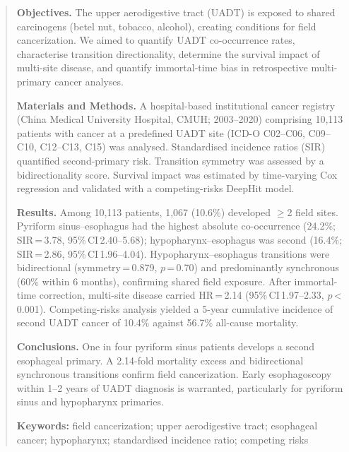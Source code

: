 \documentclass[12pt,a4paper]{article}
\begin{document}
\newpage
\begin{abstract}
\noindent\textbf{Objectives.}
The upper aerodigestive tract (UADT) is exposed to shared carcinogens (betel nut,
tobacco, alcohol), creating conditions for field cancerization.
We aimed to quantify UADT co-occurrence rates, characterise transition
directionality, determine the survival impact of multi-site disease, and
quantify immortal-time bias in retrospective multi-primary cancer analyses.

\noindent\textbf{Materials and Methods.}
A hospital-based institutional cancer registry (China Medical University Hospital,
CMUH; 2003--2020) comprising 10,113 patients with cancer at a predefined UADT site (ICD-O C02--C06, C09--C10, C12--C13, C15)
was analysed. Standardised incidence ratios (SIR) quantified second-primary risk.
Transition symmetry was assessed by a bidirectionality score.
Survival impact was estimated by time-varying Cox regression and validated with
a competing-risks DeepHit model.

\noindent\textbf{Results.}
Among 10,113 patients, 1,067 (10.6\%) developed $\geq$2 field sites.
Pyriform sinus--esophagus had the highest absolute co-occurrence (24.2\%;
SIR\,=\,3.78, 95\%\,CI\,2.40--5.68); hypopharynx--esophagus was second
(16.4\%; SIR\,=\,2.86, 95\%\,CI\,1.96--4.04). Hypopharynx--esophagus transitions
were bidirectional (symmetry\,=\,0.879, $p$\,=\,0.70) and predominantly
synchronous (60\% within 6 months), confirming shared field exposure.
After immortal-time correction, multi-site disease carried
HR\,=\,2.14 (95\%\,CI\,1.97--2.33, $p$\,<\,0.001).
Competing-risks analysis yielded a 5-year cumulative incidence of second UADT
cancer of 10.4\% against 56.7\% all-cause mortality.

\noindent\textbf{Conclusions.}
One in four pyriform sinus patients develops a second esophageal primary.
A 2.14-fold mortality excess and bidirectional synchronous transitions confirm
field cancerization. Early esophagoscopy within 1--2 years of UADT diagnosis
is warranted, particularly for pyriform sinus and hypopharynx primaries.

\bigskip
\noindent\textbf{Keywords:} field cancerization; upper aerodigestive tract;
esophageal cancer; hypopharynx; standardised incidence ratio; competing risks
\end{abstract}

\newpage
\end{document}
